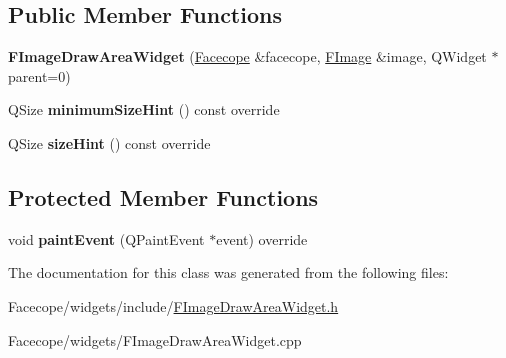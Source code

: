 \subsection*{Public Member Functions}
\begin{DoxyCompactItemize}
\item 
\mbox{\label{classFImageDrawAreaWidget_a7abc8014326256d81eb71e2296ed28b3}} 
{\bfseries F\+Image\+Draw\+Area\+Widget} (\hyperlink{structFacecope}{Facecope} \&facecope, \hyperlink{classFImage}{F\+Image} \&image, Q\+Widget $\ast$parent=0)
\item 
\mbox{\label{classFImageDrawAreaWidget_a137ca0e7a4ed84e42dccc554f62f2e23}} 
Q\+Size {\bfseries minimum\+Size\+Hint} () const override
\item 
\mbox{\label{classFImageDrawAreaWidget_a184db264e0f07a783009b77bc7f6f17d}} 
Q\+Size {\bfseries size\+Hint} () const override
\end{DoxyCompactItemize}
\subsection*{Protected Member Functions}
\begin{DoxyCompactItemize}
\item 
\mbox{\label{classFImageDrawAreaWidget_a8b393488d7169477e5c14c708a22ace3}} 
void {\bfseries paint\+Event} (Q\+Paint\+Event $\ast$event) override
\end{DoxyCompactItemize}


The documentation for this class was generated from the following files\+:\begin{DoxyCompactItemize}
\item 
Facecope/widgets/include/\hyperlink{FImageDrawAreaWidget_8h}{F\+Image\+Draw\+Area\+Widget.\+h}\item 
Facecope/widgets/F\+Image\+Draw\+Area\+Widget.\+cpp\end{DoxyCompactItemize}
